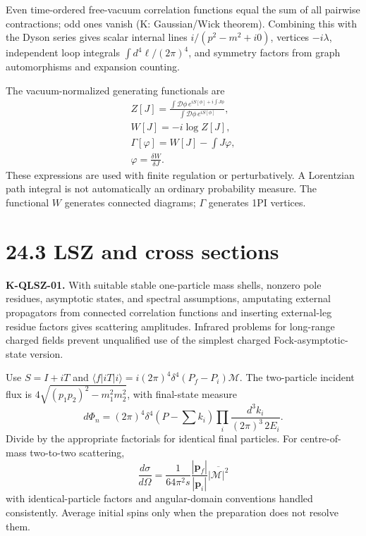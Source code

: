 \documentclass[
  11pt,
  oneside]{book}
\begin{document}
Even time-ordered free-vacuum correlation functions equal the sum of all
pairwise contractions; odd ones vanish (K: Gaussian/Wick theorem).
Combining this with the Dyson series gives scalar internal lines
\(i/(p^2-m^2+i0)\), vertices \(-i\lambda\), independent loop integrals
\(\int d^4\ell/(2\pi)^4\), and symmetry factors from graph automorphisms
and expansion counting.

The vacuum-normalized generating functionals are \[
\begin{gathered}
Z[J]=\frac{\int\mathcal D\phi\,
e^{iS[\phi]+i\int J\phi}}{\int\mathcal D\phi\,e^{iS[\phi]}},
\\ W[J]=-i\log Z[J],\\
\Gamma[\varphi]=W[J]-\int J\varphi,\\
\varphi=\frac{\delta W}{\delta J}.
\end{gathered}
\] These expressions are used with finite regulation or perturbatively.
A Lorentzian path integral is not automatically an ordinary probability
measure. The functional \(W\) generates connected diagrams; \(\Gamma\)
generates 1PI vertices.

\section{24.3 LSZ and cross sections}

\textbf{K-QLSZ-01.} With suitable stable one-particle mass shells,
nonzero pole residues, asymptotic states, and spectral assumptions,
amputating external propagators from connected correlation functions and
inserting external-leg residue factors gives scattering amplitudes.
Infrared problems for long-range charged fields prevent unqualified use
of the simplest charged Fock-asymptotic-state version.

Use \(S=I+iT\) and
\(\langle f|iT|i\rangle=i(2\pi)^4\delta^4(P_f-P_i)\mathcal M\). The
two-particle incident flux is \(4\sqrt{(p_1p_2)^2-m_1^2m_2^2}\), with
final-state measure \[
d\Phi_n=(2\pi)^4\delta^4(P-\sum k_i)
\prod_i\frac{d^3k_i}{(2\pi)^3\,2E_i}.
\] Divide by the appropriate factorials for identical final particles.
For centre-of-mass two-to-two scattering, \[
\frac{d\sigma}{d\Omega}=\frac1{64\pi^2s}
\frac{|\mathbf p_f|}{|\mathbf p_i|}\overline{|\mathcal M|^2}
\] with identical-particle factors and angular-domain conventions
handled consistently. Average initial spins only when the preparation
does not resolve them.

\label{p-qunit-01}{}
\end{document}
